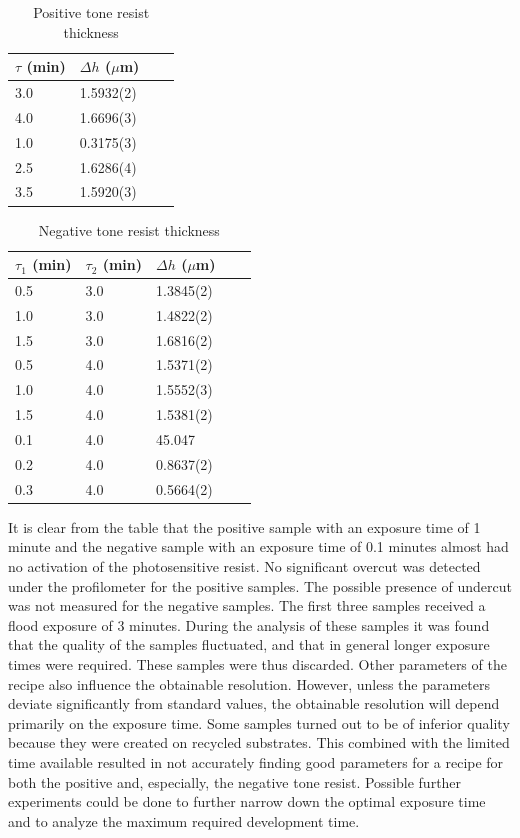 \begin{table}[H]
    \centering
    \caption{Positive tone resist thickness}
    \begin{tabular}{X l l l}
        $\tau$ (min)& $\Delta h$ ($\mu$m) \\ 
        \hline\hline
        3.0 & 1.5932(2) \\
        4.0 & 1.6696(3) \\
        1.0 & 0.3175(3) \\
        2.5 & 1.6286(4) \\
        3.5 & 1.5920(3) \\
        \hline
    \end{tabular}
    \label{tab:pos_profile}
\end{table}

\begin{table}[H]
    \centering
    \caption{Negative tone resist thickness}
    \begin{tabular}{X l l l l}
	$\tau_1$ (min) & $\tau_2$ (min) & $\Delta h$ ($\mu$m) \\ 
        \hline\hline
        0.5 & 3.0 & 1.3845(2)  \\
        1.0 & 3.0 & 1.4822(2)  \\
        1.5 & 3.0 & 1.6816(2)  \\
        0.5 & 4.0 & 1.5371(2)  \\
        1.0 & 4.0 & 1.5552(3)  \\
        1.5 & 4.0 & 1.5381(2)  \\
        0.1 & 4.0 & 45.047     \\
        0.2 & 4.0 & 0.8637(2)  \\
        0.3 & 4.0 & 0.5664(2)  \\
        \hline
    \end{tabular}
    \label{tab:neg_profile}
\end{table}

It is clear from the table that the positive sample with an exposure time of  1 minute and the negative sample with an exposure time of 0.1 minutes almost had no activation of the photosensitive resist. No significant overcut was detected under the profilometer for the positive samples. The possible presence of undercut was not measured for the negative samples.
The first three samples received a flood exposure of 3 minutes. During the analysis of these samples it was found that the quality of the samples fluctuated, and that in general longer exposure times were required. These samples were thus discarded.
Other parameters of the recipe also influence the obtainable resolution. However, unless the parameters deviate significantly from standard values, the obtainable resolution will depend primarily on the exposure time. Some samples turned out to be of inferior quality because they were created on recycled substrates. This combined with the limited time available resulted in not accurately finding good parameters for a recipe for both the positive and, especially, the negative tone resist. Possible further experiments could be done to further narrow down the optimal exposure time and to analyze the maximum required development time.
